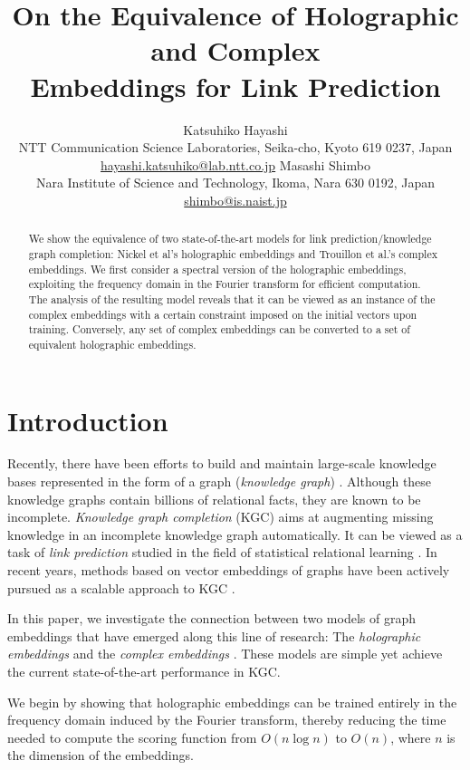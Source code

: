 \documentclass[11pt,a4paper]{article}
\title{On the Equivalence of
  Holographic and Complex\\ Embeddings
  for Link Prediction}
\author{%
  Katsuhiko Hayashi\\
  NTT Communication Science Laboratories,
  Seika-cho, Kyoto 619 0237, Japan\\
  \protect\url{hayashi.katsuhiko@lab.ntt.co.jp}%
  \AND
  Masashi Shimbo\\
  Nara Institute of Science and Technology,
  Ikoma, Nara 630 0192, Japan\\
  \protect\url{shimbo@is.naist.jp}%
}
\begin{document}
\maketitle

\begin{abstract}

  We show the equivalence of two state-of-the-art models for link prediction\slash knowledge graph completion:
  Nickel et al's holographic embeddings and Trouillon et al.'s complex embeddings.
  We first consider a spectral version of the holographic embeddings,
  exploiting the frequency domain in the Fourier transform for
  efficient computation.
  The analysis of the resulting model reveals that it can be viewed as
  an instance of the complex embeddings
  with a certain constraint imposed on the initial vectors upon training.
  Conversely, any set of complex embeddings can be converted to a set of
  equivalent holographic embeddings.

\end{abstract}


\section{Introduction}
\label{sec:intro}

Recently, there have been efforts to build and maintain large-scale knowledge bases represented in the form of a graph (\emph{knowledge graph})
\cite{Auer:07,Bollacker:08,Suchanek:07}.
Although these knowledge graphs contain billions of relational facts,
they are known to be incomplete.
\emph{Knowledge graph completion} (KGC) \cite{Nickel:15} aims at augmenting missing knowledge in an incomplete knowledge graph automatically.
It can be viewed as a task of \emph{link prediction} \cite{Liben-Nowell:03,Hasan:11}
studied in the field of statistical relational learning \cite{Getoor:07}.
In recent years, methods based on vector embeddings of graphs have been actively pursued as a scalable approach to KGC
\citep{
  Bordes:11, %
  Socher:13,
  Guu:15, %
  Yang:15,
  Nickel:16, %
  Trouillon:16%
}.

In this paper, we investigate the connection between two models of graph embeddings that have emerged along this line of research:
The \emph{holographic embeddings} %
\citep{Nickel:16}
and
the \emph{complex embeddings} %
\cite{Trouillon:16}.
These models are simple yet achieve the current state-of-the-art performance in KGC.

We begin by showing that %
holographic embeddings
can be trained entirely in the frequency domain induced by the Fourier transform,
thereby reducing the time needed to compute the scoring function from $O(n\log n)$ to $O(n)$,
where $n$ is the dimension of the embeddings.
\end{document}
